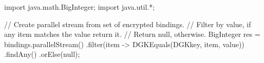 import java.math.BigInteger;
import java.util.*;

// Create parallel stream from set of encrypted bindings. 
// Filter by value, if any item matches the value return it. 
// Return null, otherwise.
BigInteger res = bindings.parallelStream()
        .filter(item -> DGKEquals(DGKkey, item, value))
        .findAny()
        .orElse(null);                                        
